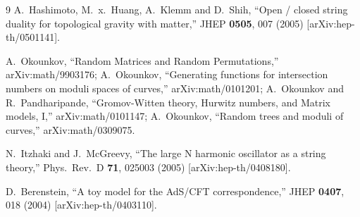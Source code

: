 \documentclass[11pt]{JHEP3}
\begin{document}
\begin{thebibliography}{9}
  A.~Hashimoto, M.~x.~Huang, A.~Klemm and D.~Shih,
  ``Open / closed string duality for topological gravity with matter,''
  JHEP {\bf 0505}, 007 (2005)
  [arXiv:hep-th/0501141].


A.~Okounkov, ``Random Matrices and Random Permutations,'' arXiv:math/9903176;
A.~Okounkov, ``Generating functions for intersection numbers on moduli
spaces of curves,'' arXiv:math/0101201;
A.~Okounkov and R.~Pandharipande, ``Gromov-Witten theory, Hurwitz numbers, and Matrix models, I,''
arXiv:math/0101147;
A.~Okounkov, ``Random trees and moduli of curves,'' arXiv:math/0309075.

  N.~Itzhaki and J.~McGreevy,
  ``The large N harmonic oscillator as a string theory,''
  Phys.\ Rev.\  D {\bf 71}, 025003 (2005)
  [arXiv:hep-th/0408180].

  D.~Berenstein,
  ``A toy model for the AdS/CFT correspondence,''
  JHEP {\bf 0407}, 018 (2004)
  [arXiv:hep-th/0403110].


\end{thebibliography}
\end{document}
